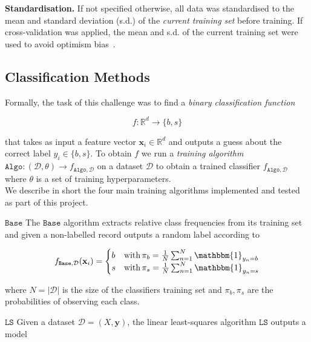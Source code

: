 \documentclass[10pt,conference,compsocconf]{IEEEtran}
\newcommand{\parabf}[1]{\vspace{1mm}\noindent\textbf{#1}}
\newcommand{\Data}{\mathcal{D}}
\newcommand{\features}{\mathbf{x}_i}
\newcommand{\target}{y_i}
\newcommand{\targetset}{\{ b, s \}}
\newcommand{\targetvector}{\mathbf{y}}
\newcommand{\classifier}[2]{f_{#1, #2}}
\newcommand{\Train}{\mathtt{Algo}}
\newcommand{\LeastSquares}{\mathtt{LS}}
\newcommand{\Baseline}{\mathtt{Base}}
\begin{document}
\parabf{Standardisation.} If not specified otherwise, all data was standardised to the mean and standard deviation (s.d.) of the \emph{current training set} before training. If cross-validation was applied, the mean and s.d. of the current training set were used to avoid optimism bias~\cite{Domingos2012}. 

\vspace*{-3.mm}
\subsection{Classification Methods}
Formally, the task of this challenge was to find a \emph{binary classification function}

\vspace*{-4mm}
\begin{equation}
	f: \mathbb{R}^d \rightarrow \targetset
\end{equation}

that takes as input a feature vector $\features \in \mathbb{R}^d$ and outputs a guess about the correct label $\target \in \targetset$. To obtain $f$ we run a \emph{training algorithm} $\Train: (\Data, \theta) \rightarrow \classifier{\Train}{\Data}$ on a dataset $\Data$ to obtain a trained classifier $\classifier{\Train}{\Data}$ where $\theta$ is a set of training hyperparameters.\\

We describe in short the four main training algorithms implemented and tested as part of this project.

\parabf{$\Baseline$} The $\Baseline$ algorithm extracts relative class frequencies from its training set and given a non-labelled record outputs a random label according to

\vspace*{-2mm}
\begin{equation}
	\classifier{\Baseline}{\Data}(\features) = 
	\begin{cases}
	b &\mbox{with}\,  \pi_b = \frac{1}{N} \sum_{n=1}^N{\mathbbm{1}_{y_n = b}}\\
	s &\mbox{with}\,  \pi_s = \frac{1}{N} \sum_{n=1}^N{\mathbbm{1}_{y_n = s}}
	\end{cases}
\end{equation}

where $N = |\Data|$ is the size of the classifiers training set and $\pi_b, \pi_s$ are the probabilities of observing each class. 

\parabf{$\LeastSquares$} Given a dataset $\Data = (X, \targetvector)$, the linear least-squares algorithm $\LeastSquares$ outputs a model
\end{document}
